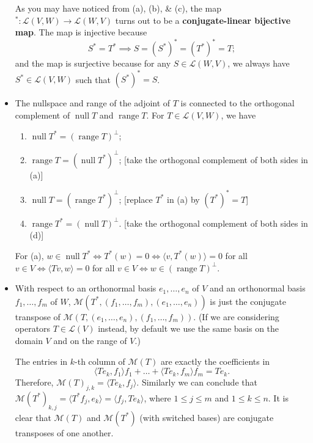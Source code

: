 \documentclass{article}
\newcommand{\n}{\operatorname{null}}
\renewcommand{\r}{\operatorname{range}}
\newcommand{\inp}[2]{\langle #1, #2 \rangle}
\newcommand{\LV}{\mathcal{L}(V)}
\newcommand{\LVW}{\mathcal{L}(V,W)}
\newcommand{\M}{\mathcal{M}}
\begin{document}
\begin{itemize}
    As you may have noticed from (a), (b), \& (c), the map $^*: \LVW \to \mathcal{L}(W,V)$ turns out to be a \textbf{conjugate-linear bijective map}. The map is injective because $$S^*=T^* \implies S=(S^*)^*=(T^*)^*=T;$$ and the map is surjective because for any $S \in \mathcal{L}(W,V)$, we always have $S^* \in \LVW$ such that $(S^*)^*=S$.
    \item The nullspace and range of the adjoint of $T$ is connected to the orthogonal complement of $\n T$ and $\r T$. For $T \in \LVW$, we have
    \begin{enumerate}[label=(\alph*)]
        \item $\n T^* = (\r T)^\perp$;
        \item $\r T = (\n T^*)^\perp$; [take the orthogonal complement of both sides in (a)]
        \item $\n T = (\r T^*)^\perp$; [replace $T^*$ in (a) by $(T^*)^* = T$]
        \item $\r T^* = (\n T)^\perp$. [take the orthogonal complement of both sides in (d)]
    \end{enumerate}
    For (a), $w \in \n T^* \iff T^*(w) = 0 \iff \inp{v}{T^*(w)} = 0$ for all $v \in V \iff \inp{Tv}{w} = 0$ for all $v \in V \iff w \in (\r T)^\perp$.
    \item With respect to an orthonormal basis $e_1,\dots,e_n$ of $V$ and an orthonormal basis $f_1,\dots,f_m$ of $W$, $\M(T^*,(f_1,\dots,f_m),(e_1,\dots,e_n))$ is just the conjugate transpose of $\M(T,(e_1,\dots,e_n),(f_1,\dots,f_m))$. (If we are considering operators $T \in \LV$ instead, by default we use the same basis on the domain $V$ and on the range of $V$.)
    
    The entries in $k$-th column of $\M(T)$ are exactly the coefficients in
    $$\inp{Te_k}{f_1}f_1+\dots+\inp{Te_k}{f_m}f_m = Te_k.$$ Therefore, $\M(T)_{j,k} = \inp{Te_k}{f_j}$. Similarly we can conclude that $\M(T^*)_{k,j} = \inp{T^*f_j}{e_k} = \inp{f_j}{Te_k}$, where $1 \leq j \leq m$ and $1 \leq k \leq n$. It is clear that $\M(T)$ and $\M(T^*)$ (with switched bases) are conjugate transposes of one another.


\end{itemize}
\end{document}
